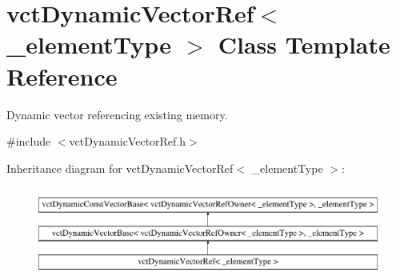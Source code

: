 \hypertarget{classvct_dynamic_vector_ref}{\section{vct\-Dynamic\-Vector\-Ref$<$ \-\_\-element\-Type $>$ Class Template Reference}
\label{classvct_dynamic_vector_ref}
}


Dynamic vector referencing existing memory.  




{\ttfamily \#include $<$vct\-Dynamic\-Vector\-Ref.\-h$>$}

Inheritance diagram for vct\-Dynamic\-Vector\-Ref$<$ \-\_\-element\-Type $>$\-:\begin{figure}[H]
\begin{center}
\leavevmode
\includegraphics[height=3.000000cm]{d7/df1/classvct_dynamic_vector_ref}
\end{center}
\end{figure}
